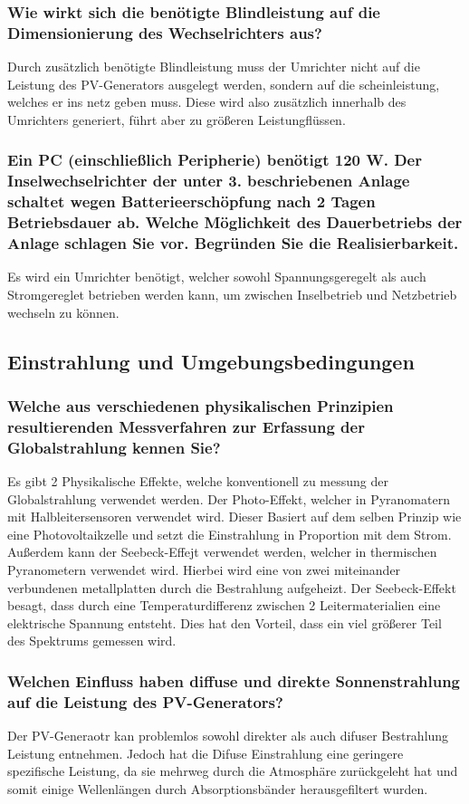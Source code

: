 \subsubsection{Wie wirkt sich die benötigte Blindleistung auf die Dimensionierung des Wechselrichters aus?}
Durch zusätzlich benötigte Blindleistung muss der Umrichter nicht auf die Leistung des PV-Generators ausgelegt werden, sondern auf die scheinleistung, welches er ins netz geben muss.
Diese wird also zusätzlich innerhalb des Umrichters generiert, führt aber zu größeren Leistungflüssen.
\subsubsection{Ein PC (einschließlich Peripherie) benötigt 120 W. Der Inselwechselrichter der unter 3. beschriebenen Anlage schaltet wegen Batterieerschöpfung nach 2 Tagen Betriebsdauer ab. Welche Möglichkeit des Dauerbetriebs der Anlage schlagen Sie vor. Begründen Sie die Realisierbarkeit.}
Es wird ein Umrichter benötigt, welcher sowohl Spannungsgeregelt als auch Stromgereglet betrieben werden kann, um zwischen Inselbetrieb und Netzbetrieb wechseln zu können.
\subsection{Einstrahlung und Umgebungsbedingungen}
\subsubsection{Welche aus verschiedenen physikalischen Prinzipien resultierenden Messverfahren zur Erfassung der Globalstrahlung kennen Sie?}
Es gibt 2 Physikalische Effekte, welche konventionell zu messung der Globalstrahlung verwendet werden. 
Der Photo-Effekt, welcher in Pyranomatern mit Halbleitersensoren verwendet wird. 
Dieser Basiert auf dem selben Prinzip wie eine Photovoltaikzelle und setzt die Einstrahlung in Proportion mit dem Strom.
Außerdem kann der Seebeck-Effejt verwendet werden, welcher in thermischen Pyranometern verwendet wird.
Hierbei wird eine von zwei miteinander verbundenen metallplatten durch die Bestrahlung aufgeheizt. 
Der Seebeck-Effekt besagt, dass durch eine Temperaturdifferenz zwischen 2 Leitermaterialien eine elektrische Spannung entsteht.\cite{Wiki-Seebeck}
Dies hat den Vorteil, dass ein viel größerer Teil des Spektrums gemessen wird.

\subsubsection{Welchen Einfluss haben diffuse und direkte Sonnenstrahlung auf die Leistung des PV-Generators?}
Der PV-Generaotr kan problemlos sowohl direkter als auch difuser Bestrahlung Leistung entnehmen. 
Jedoch hat die Difuse Einstrahlung eine geringere spezifische Leistung, da sie mehrweg durch die Atmosphäre zurückgeleht hat und somit einige Wellenlängen durch Absorptionsbänder herausgefiltert wurden.
